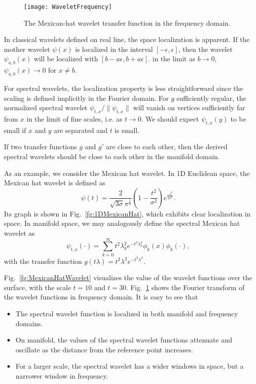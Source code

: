 \begin{figure}
  \centering
  \texttt{[image: WaveletFrequency]}\\
  \caption[Transfer function of the Mexican-hat wavelet.]
  {The Mexican-hat wavelet transfer function in the frequency domain. }\label{fg:WaveletFrequency}
\end{figure}

In classical wavelets defined on real line, the space localization is apparent.
If the mother wavelet $\psi(x)$ is localized in the interval $[-\epsilon,\epsilon]$,
then the wavelet $\psi_{a,b}(x)$ will be localized with $[b-a\epsilon,b+a\epsilon]$.
in the limit as $b\to 0$, $\psi_{a,b}(x)\to 0$ for $x\neq b$.

For spectral wavelets, the localization property is less straightforward since the scaling is
defined implicitly in the Fourier domain. For $g$ sufficiently regular, the normalized spectral
wavelet $\psi_{t,x}/\|\psi_{t,x}\|$ will vanish on vertices sufficiently far from $x$ in the
limit of fine scales, i.e. as $t\to 0$. We should expect $\psi_{t,x}(y)$ to be small if $x$
and $y$ are separated and $t$ is small.

If two transfer functions $g$ and $g'$ are close to each other, then the derived spectral
wavelets should be close to each other in the manifold domain.

As an example, we consider the Mexican hat wavelet. In 1D Euclidean space, the Mexican hat wavelet is defined as
\begin{equation}
\psi(t)=\frac{2}{\sqrt{3\sigma}\pi^{\frac{1}{4}}}(1-\frac{t^2}{\sigma^2})e^{\frac{-t^2}{2\sigma^2}}.
\end{equation}
Its graph is shown in Fig.~\ref{fg:1DMexicanHat}, which exhibits clear localization in space. In manifold space, we may analogously define the spectral Mexican hat wavelet as
\begin{equation}
\psi_{t,x}(\cdot)=\sum_{k=0}^\infty t^2\lambda_k^2 e^{-t^2\lambda_k^2}\phi_k(x)\phi_k(\cdot),
\end{equation}
with the transfer function $g(t\lambda)=t^2\lambda^2 e^{-t^2\lambda^2}$.

Fig.~\ref{fg:MexicanHatWavelet} visualizes the value of the wavelet functions over the surface, with the scale $t=10$ and $t=30$. Fig.~\ref{fg:WaveletFrequency} shows the Fourier transform of the wavelet functions in frequency domain. It is easy to see that

\begin{itemize}
\item The spectral wavelet function is localized in both manifold and frequency domains.
\item On manifold, the values of the spectral wavelet functions attenuate and oscillate as the distance from the reference point increases.
\item For a larger scale, the spectral wavelet has a wider windows in space, but a narrower window in frequency.
\end{itemize}

